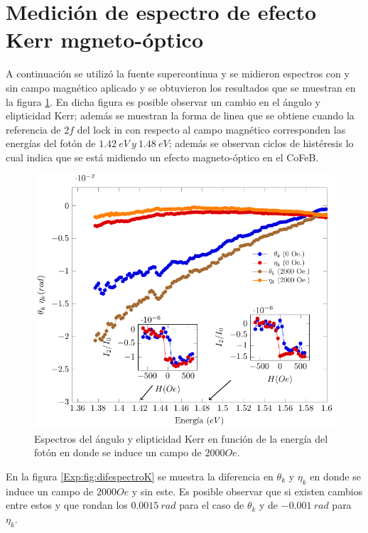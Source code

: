 \section{Medici\'on de espectro de efecto Kerr mgneto-\'optico}
\par A continuaci\'on se utiliz\'o la fuente supercontinua y se midieron espectros con y sin campo magn\'etico aplicado y se obtuvieron los resultados que se muestran en la figura \ref{Exp:fig:espectroK}. En dicha figura es posible observar un cambio en el \'angulo y elipticidad Kerr; adem\'as se muestran la forma de linea que se obtiene cuando la referencia de $2f$ del lock in con respecto al campo magn\'etico corresponden las energ\'ias del fot\'on de $1.42 ~eV~y~1.48~eV$; adem\'as se observan ciclos de hist\'eresis lo cual indica que se est\'a midiendo un efecto magneto-\'optico en el CoFeB.
\begin{figure}[!hbt]
	\centering
	\includegraphics[scale=1]{resexp/esp/espectro0.pdf}
	\caption[Espectro de efecto Kerr magneto-\'optico]{Espectros del \'angulo y elipticidad Kerr en funci\'on de la energ\'ia del fot\'on en donde se induce un campo de $2000 Oe$.}
	\label{Exp:fig:espectroK}
\end{figure}
\newline
\par En la figura  \ref{Exp:fig:difespectroK} se muestra la diferencia en $\theta_k$ y $\eta_k$ en donde se induce un campo de $2000 Oe$ y sin este. Es posible observar que si existen cambios entre estos y que rondan los $0.0015 ~rad$ para el caso de $\theta_k$ y de $-0.001 ~rad$ para $\eta_k$.

